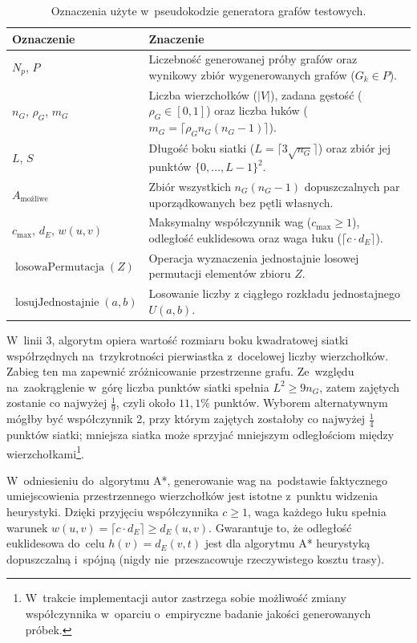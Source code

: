 \documentclass[11pt,a4paper,oneside]{report}
\begin{document}
\begin{table}[H]
  \centering
  \small
  \renewcommand{\arraystretch}{1.1}
  \begin{tabularx}{0.95\textwidth}{@{}lX@{}}
    \toprule
    \textbf{Oznaczenie} & \textbf{Znaczenie} \\
    \midrule
    $N_p$, $P$ & Liczebność generowanej próby grafów oraz wynikowy zbiór wygenerowanych grafów ($G_k \in P$). \\
    $n_G$, $\rho_G$, $m_G$ & Liczba wierzchołków ($|V|$), zadana gęstość ($\rho_G \in [0, 1]$) oraz liczba łuków ($m_G = \lceil \rho_G n_G (n_G - 1)\rceil$). \\
    $L$, $S$ & Długość boku siatki ($L = \lceil 3\sqrt{n_G}\rceil$) oraz zbiór jej punktów $\{0, \ldots, L - 1\}^2$. \\
    $A_{\mathrm{możliwe}}$ & Zbiór wszystkich $n_G(n_G - 1)$ dopuszczalnych par uporządkowanych bez pętli własnych. \\
    $c_{\max}$, $d_E$, $w(u, v)$ & Maksymalny współczynnik wag ($c_{\max} \ge 1$), odległość euklidesowa oraz waga łuku ($\lceil c \cdot d_E\rceil$). \\
    $\operatorname{losowaPermutacja}(Z)$ & Operacja wyznaczenia jednostajnie losowej permutacji elementów zbioru $Z$. \\
    $\operatorname{losujJednostajnie}(a, b)$ & Losowanie liczby z ciągłego rozkładu jednostajnego $U(a, b)$. \\
    \bottomrule
  \end{tabularx}
  \caption{Oznaczenia użyte w~pseudokodzie generatora grafów testowych.}
  \label{tab:oznaczenia-generatora}
\end{table}

W~linii 3, algorytm opiera wartość rozmiaru boku kwadratowej siatki współrzędnych na~trzykrotności pierwiastka z~docelowej liczby wierzchołków. Zabieg ten ma zapewnić zróżnicowanie przestrzenne grafu. Ze~względu na~zaokrąglenie w~górę liczba punktów siatki spełnia $L^2 \ge 9n_G$, zatem zajętych zostanie co najwyżej $\frac{1}{9}$, czyli około $11{,}1\%$ punktów. Wyborem alternatywnym mógłby być współczynnik 2, przy którym zajętych zostałoby co najwyżej $\frac{1}{4}$ punktów siatki; mniejsza siatka może sprzyjać mniejszym odległościom między wierzchołkami\footnote{W~trakcie implementacji autor zastrzega sobie możliwość zmiany współczynnika w~oparciu o~empiryczne badanie jakości generowanych próbek.}.

W~odniesieniu do~algorytmu A*, generowanie wag na~podstawie faktycznego umiejscowienia przestrzennego wierzchołków jest istotne z~punktu widzenia heurystyki. Dzięki przyjęciu współczynnika $c \ge 1$, waga każdego łuku spełnia warunek $w(u, v) = \lceil c \cdot d_E \rceil \ge d_E(u, v)$. Gwarantuje to, że odległość euklidesowa do~celu $h(v) = d_E(v, t)$ jest dla algorytmu A* heurystyką dopuszczalną i~spójną (nigdy nie~przeszacowuje rzeczywistego kosztu trasy).
\end{document}
